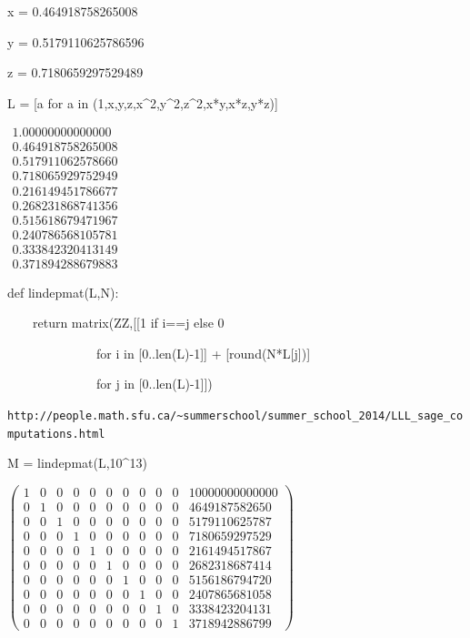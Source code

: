 \documentclass{beamer}
\begin{document}
\begin{frame}
\begin{semiverbatim}
\small
x = 0.464918758265008

y = 0.5179110625786596

z = 0.7180659297529489



L = [a for a in (1,x,y,z,x\^{}2,y\^{}2,z\^{}2,x*y,x*z,y*z)]


$\begin{array}{r}
1.00000000000000 \\
0.464918758265008 \\
0.517911062578660 \\
0.718065929752949 \\
0.216149451786677 \\
0.268231868741356 \\
0.515618679471967 \\
0.240786568105781 \\
0.333842320413149 \\
0.371894288679883
\end{array}
$

\end{semiverbatim}
\end{frame}

\begin{frame}
\begin{semiverbatim}
\small

def lindepmat(L,N):

\ \ \ \ return matrix(ZZ,[[1 if i==j else 0

\ \ \ \ \ \ \ \ \ \ \ \ \ \   for i in [0..len(L)-1]] + [round(N*L[j])]

\ \ \ \ \ \ \ \ \ \ \ \ \ \   for j in [0..len(L)-1]])

{\tiny {\tt http://people.math.sfu.ca/\~{}summerschool/summer\_school\_2014/LLL\_sage\_computations.html}}



M = lindepmat(L,10\^{}13)


$\left(\begin{array}{rrrrrrrrrrr}
1 & 0 & 0 & 0 & 0 & 0 & 0 & 0 & 0 & 0 & 10000000000000 \\
0 & 1 & 0 & 0 & 0 & 0 & 0 & 0 & 0 & 0 & 4649187582650 \\
0 & 0 & 1 & 0 & 0 & 0 & 0 & 0 & 0 & 0 & 5179110625787 \\
0 & 0 & 0 & 1 & 0 & 0 & 0 & 0 & 0 & 0 & 7180659297529 \\
0 & 0 & 0 & 0 & 1 & 0 & 0 & 0 & 0 & 0 & 2161494517867 \\
0 & 0 & 0 & 0 & 0 & 1 & 0 & 0 & 0 & 0 & 2682318687414 \\
0 & 0 & 0 & 0 & 0 & 0 & 1 & 0 & 0 & 0 & 5156186794720 \\
0 & 0 & 0 & 0 & 0 & 0 & 0 & 1 & 0 & 0 & 2407865681058 \\
0 & 0 & 0 & 0 & 0 & 0 & 0 & 0 & 1 & 0 & 3338423204131 \\
0 & 0 & 0 & 0 & 0 & 0 & 0 & 0 & 0 & 1 & 3718942886799
\end{array}\right)
$

\end{semiverbatim}
\end{frame}
\end{document}
